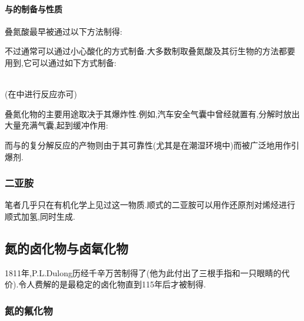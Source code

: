 \documentclass{ctexart}
\begin{document}
\paragraph{与的制备与性质}
叠氮酸最早被通过以下方法制得:
\begin{center}
\end{center}
不过通常可以通过小心酸化的方式制备.大多数制取叠氮酸及其衍生物的方法都要用到,它可以通过如下方式制备:
\begin{center}
    \\
    (在中进行反应亦可)\\
\end{center}
叠氮化物的主要用途取决于其爆炸性.例如,汽车安全气囊中曾经就置有,分解时放出大量充满气囊,起到缓冲作用:
\begin{center}
\end{center}
而与的复分解反应的产物则由于其可靠性(尤其是在潮湿环境中)而被广泛地用作引爆剂.
\subsubsection{二亚胺}
笔者几乎只在有机化学上见过这一物质.顺式的二亚胺可以用作还原剂对烯烃进行顺式加氢,同时生成.
\subsection{氮的卤化物与卤氧化物}
1811年,P.L.Dulong历经千辛万苦制得了(他为此付出了三根手指和一只眼睛的代价).令人费解的是最稳定的卤化物直到115年后才被制得.
\subsubsection{氮的氟化物}
\end{document}
